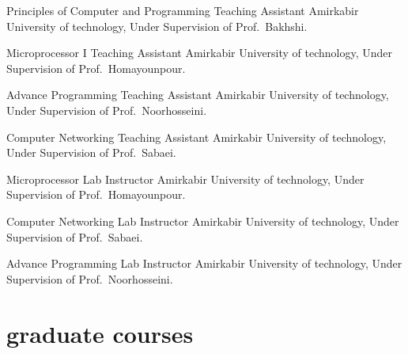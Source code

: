 \documentclass[]{friggeri-cv} %
\begin{document}
\begin{entrylist}

	{Principles of Computer and Programming}
	{Teaching Assistant}
	{Amirkabir University of technology, Under Supervision of Prof.\ Bakhshi.}

	
	{Microprocessor I}
	{Teaching Assistant}
	{Amirkabir University of technology, Under Supervision of Prof.\ Homayounpour.}
	

	{Advance Programming}
	{Teaching Assistant}
	{Amirkabir University of technology, Under Supervision of Prof.\ Noorhosseini.}
	

	{Computer Networking}
	{Teaching Assistant}
	{Amirkabir University of technology, Under Supervision of Prof.\ Sabaei.}
	

	{Microprocessor Lab}
	{Instructor}
	{Amirkabir University of technology, Under Supervision of Prof.\ Homayounpour.}


	{Computer Networking Lab}
	{Instructor}
	{Amirkabir University of technology, Under Supervision of Prof.\ Sabaei.}


	{Advance Programming Lab}
	{Instructor}
	{Amirkabir University of technology, Under Supervision of Prof.\ Noorhosseini.}
	


\end{entrylist}


\section{graduate courses}
\end{document}
